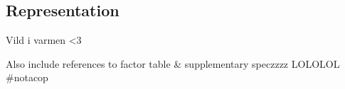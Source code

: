 \subsection{Representation}

Vild i varmen <3

Also include references to factor table \& supplementary speczzzz LOLOLOL \#notacop